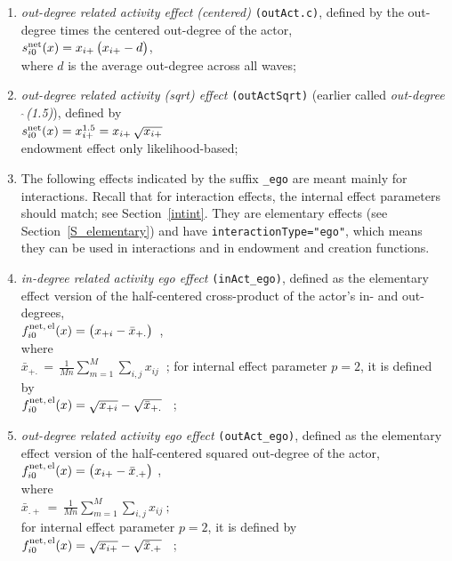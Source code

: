 \documentclass[a4paper,fleqn,11pt]{article}
\newcommand{\+}{\, + \,}
\newcommand{\vit}{\theenumi}
\begin{document}
\begin{enumerate}
 \item {\em out-degree related activity effect (centered)} \texttt{(outAct.c)},
 defined by the out-degree times the centered out-degree of the actor,\\
 $s^{\rm net}_{i\vit}(x) =  x_{i+}\,\big( x_{i+} - d \big)$,\\
 where $d$ is the average out-degree across all waves;

 \item {\em out-degree related activity (sqrt) effect}  \texttt{(outActSqrt)}
 (earlier called {\em out-degree$\,\hat{\ }$(1.5)}), defined by  \\
 $s^{\rm net}_{i\vit}(x) = x^{1.5}_{i+} = x_{i+}\,\sqrt{x_{i+}}$ \\
 endowment effect only likelihood-based;


 \item[{\hspace*{-1ex}$\bigodot$}]
The following effects indicated by the suffix \texttt{\_ego} are meant mainly for interactions.
Recall that for interaction effects, the internal effect parameters
should match; see Section~\ref{intint}.
They are elementary effects (see Section~\ref {S_elementary}) and have
\texttt{interactionType="ego"},
which means they can be used in interactions  and in endowment and creation functions.

 \item {\em in-degree related activity ego effect} \texttt{(inAct\_ego)},
 	 defined as the elementary effect version of the  half-centered  cross-product
 of the actor's in- and out-degrees,\\
 $ f^{\rm net,\, el}_{i\vit}(x) = \big(  x_{+i} - \bar x_{+.}\big)$\ ,\\
 where\\
 $ \bar x_{+.} \,=\,  \frac{1}{Mn} \sum_{m=1}^M \sum_{i,j} x_{ij} \ $ ;
 for internal effect parameter $p=2$, it is defined by\\
 $f^{\rm net,\, el}_{i\vit}(x)  =   \sqrt{   x_{+i}} - \sqrt{\bar x_{+.}} $ \ ; \\

 \item {\em out-degree related activity ego effect} \texttt{(outAct\_ego)},
 	 defined as the elementary effect version of the half-centered
 squared out-degree of the actor,\\
 $ f^{\rm net,\, el}_{i\vit}(x)  =  \big(  x_{i+} - \bar x_{.+}\big)$ ,\\
 where\\
 $ \bar x_{.+} \,=\,  \frac{1}{Mn} \sum_{m=1}^M \sum_{i,j} x_{ij} \ ;  $ \\
 for internal effect parameter $p=2$, it is defined by\\
 $f^{\rm net,\, el}_{i\vit}(x)  =   \sqrt{  x_{i+}} -  \sqrt{\bar x_{.+}} $ \ ; \\


\end{enumerate}
\end{document}
